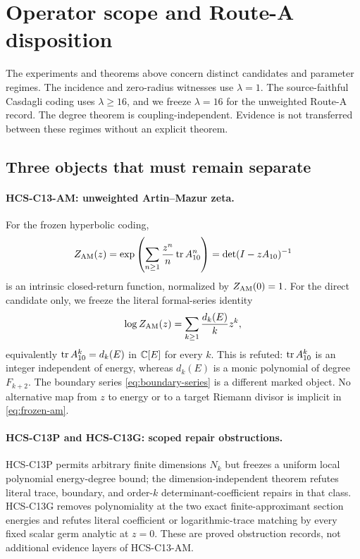 \section{Operator scope and Route-A disposition}

The experiments and theorems above concern distinct candidates and parameter
regimes.  The incidence and zero-radius witnesses use \(\lambda=1\).  The
source-faithful Casdagli coding uses \(\lambda\ge16\), and we freeze
\(\lambda=16\) for the unweighted Route-A record.  The degree theorem is
coupling-independent.  Evidence is not transferred between these regimes
without an explicit theorem.

\subsection{Three objects that must remain separate}

\paragraph{HCS-C13-AM: unweighted Artin--Mazur zeta.}
For the frozen hyperbolic coding,
\begin{equation}
Z_{\mathrm{AM}}(z)=
\exp\left(\sum_{n\ge1}\frac{z^n}{n}\operatorname{tr} A_{10}^n\right)
=\det(I-zA_{10})^{-1}
\label{eq:frozen-am}
\end{equation}
is an intrinsic closed-return function, normalized by \(Z_{\mathrm{AM}}(0)=1\).
For the direct candidate only, we freeze the literal formal-series identity
\[
\log Z_{\mathrm{AM}}(z)=\sum_{k\ge1}\frac{d_k(E)}{k}z^k,
\]
equivalently \(\operatorname{tr} A_{10}^k=d_k(E)\) in \(\mathbb C[E]\) for every \(k\).
This is refuted: \(\operatorname{tr} A_{10}^k\) is an integer independent of energy, whereas
\(d_k(E)\) is a monic polynomial of degree \(F_{k+2}\).
The boundary series \eqref{eq:boundary-series} is a different marked object.
No alternative map from \(z\) to energy or to a target Riemann divisor is
implicit in \eqref{eq:frozen-am}.

\paragraph{HCS-C13P and HCS-C13G: scoped repair obstructions.}
HCS-C13P permits arbitrary finite dimensions \(N_k\) but freezes a uniform
local polynomial energy-degree bound; the dimension-independent theorem
refutes literal trace, boundary, and order-\(k\) determinant-coefficient
repairs in that class.  HCS-C13G removes polynomiality at the two exact
finite-approximant section energies and refutes literal coefficient or
logarithmic-trace matching
by every fixed scalar germ analytic at \(z=0\).  These are proved obstruction
records, not additional evidence layers of HCS-C13-AM.

